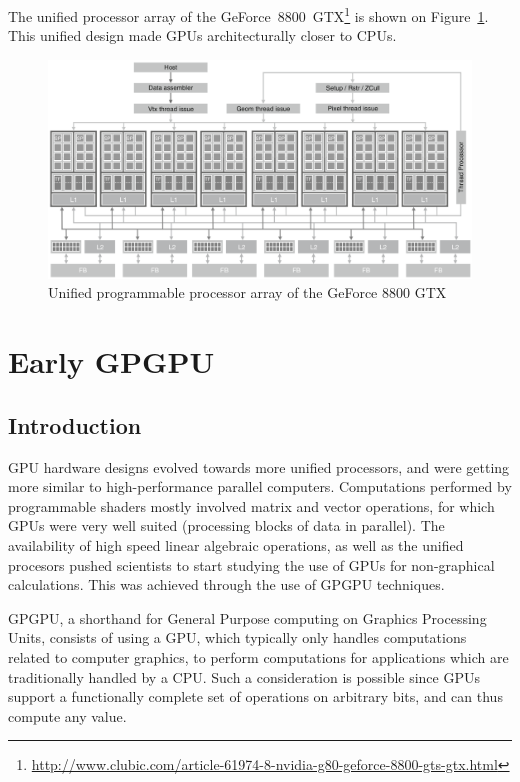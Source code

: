 \documentclass[12pt, a4paper]{report}
\begin{document}
\begin{sloppypar}
The unified processor array of the GeForce~8800~GTX\footnote{\url{http://www.clubic.com/article-61974-8-nvidia-g80-geforce-8800-gts-gtx.html}} is shown on
Figure~\ref{fig:unified_programmable_processor_array_of_the_GeForce_8800_GTX_graphics_pipeline}.
This unified design made GPUs architecturally closer to CPUs.

\begin{figure}[h]
\includegraphics[width=\linewidth]{figs/unified_programmable_processor_array_of_the_GeForce_8800_GTX_graphics_pipeline}
\caption{Unified programmable processor array of the GeForce 8800 GTX}
\label{fig:unified_programmable_processor_array_of_the_GeForce_8800_GTX_graphics_pipeline}
\end{figure}

\section{Early GPGPU}
\subsection{Introduction}
GPU hardware designs evolved towards more unified processors, and were getting
more similar to high-performance parallel computers.
Computations performed by programmable shaders mostly involved matrix and vector
operations, for which GPUs were very well suited (processing blocks of data in
parallel).
The availability of high speed linear algebraic operations, as well as the
unified procesors pushed scientists to start studying the use of GPUs for
non-graphical calculations.
This was achieved through the use of GPGPU techniques.

GPGPU, a shorthand for General Purpose computing on Graphics Processing Units,
consists of using a GPU, which typically only handles computations related to
computer graphics, to perform computations for applications which are
traditionally handled by a CPU.
Such a consideration is possible since GPUs support a functionally complete set
of operations on arbitrary bits, and can thus compute any value.


\end{sloppypar}
\end{document}
